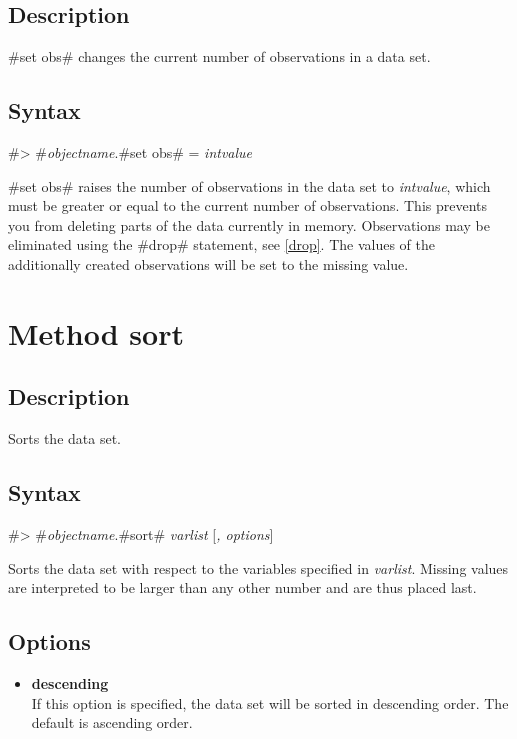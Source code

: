 \subsection*{Description}

#set obs# changes the current number of observations in a data
set.


\subsection*{Syntax}

#> #{\em objectname}.#set obs# = {\em intvalue}

#set obs# raises the number of observations in the data set to
{\em intvalue}, which must be greater or equal to the current
number of observations. This prevents you from deleting parts of
the data currently in memory. Observations may be eliminated using
the #drop# statement, see \autoref{drop}. The values of the
additionally created observations will be set to the missing
value.



\section{Method sort}
\label{sort}  


\subsection*{Description}

Sorts the data set.


\subsection*{Syntax}

#> #{\em objectname}.#sort# {\em varlist}  [{\em , options}]

Sorts the data set with respect to the variables specified in {\em
varlist}. Missing values are interpreted to be larger than any
other number and are thus placed last.


\subsection*{Options}

\begin{itemize}
\item {\bf descending}  \\
If this option is specified, the data set will be sorted in
descending order. The default is ascending order.
\end{itemize}


